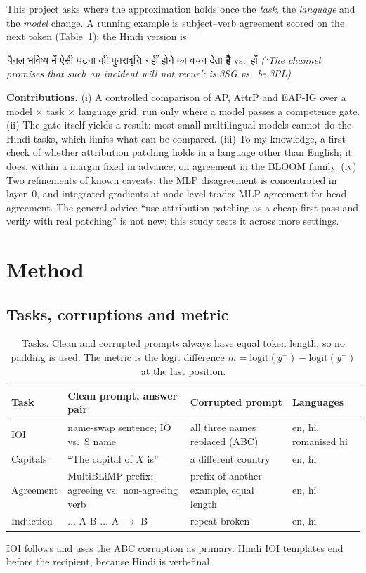\documentclass[10pt,a4paper]{article}
\newcommand{\hi}[1]{{\hindifont #1}}
\begin{document}
This project asks where the approximation holds once the \emph{task}, the \emph{language} and the \emph{model} change. A running example is subject--verb agreement scored on the next token (Table~\ref{tab:tasks}); the Hindi version is
\begin{center}\small
\hi{चैनल भविष्य में ऐसी घटना की पुनरावृत्ति नहीं होने का वचन देता} \;\textbf{\hi{है}} vs.\ \hi{हों}\quad
\textit{(`The channel promises that such an incident will not recur': is.3SG vs.\ be.3PL)}
\end{center}
\textbf{Contributions.} (i) A controlled comparison of AP, AttrP and EAP-IG over a model $\times$ task $\times$ language grid, run only where a model passes a competence gate. (ii) The gate itself yields a result: most small multilingual models cannot do the Hindi tasks, which limits what can be compared. (iii) To my knowledge, a first check of whether attribution patching holds in a language other than English; it does, within a margin fixed in advance, on agreement in the BLOOM family. (iv) Two refinements of known caveats: the MLP disagreement is concentrated in layer~0, and integrated gradients at node level trades MLP agreement for head agreement. The general advice ``use attribution patching as a cheap first pass and verify with real patching'' is not new; this study tests it across more settings.

\section{Method}
\subsection{Tasks, corruptions and metric}
\begin{table}[h]
\centering\small
\begin{tabular}{@{}lp{5.6cm}p{4.3cm}p{2.2cm}@{}}
\toprule
Task & Clean prompt, answer pair & Corrupted prompt & Languages\\
\midrule
IOI & name-swap sentence; IO vs.\ S name & all three names replaced (ABC) & en, hi, romanised hi\\
Capitals & ``The capital of $X$ is'' & a different country & en, hi\\
Agreement & MultiBLiMP prefix; agreeing vs.\ non-agreeing verb \citep{jumelet2025multiblimp} & prefix of another example, equal length & en, hi\\
Induction & $\dots$ A B $\dots$ A $\to$ B & repeat broken & en, hi\\
\bottomrule
\end{tabular}
\caption{Tasks. Clean and corrupted prompts always have equal token length, so no padding is used. The metric is the logit difference $m=\mathrm{logit}(y^+)-\mathrm{logit}(y^-)$ at the last position.}
\label{tab:tasks}
\end{table}
IOI follows \citet{wang2022ioi} and uses the ABC corruption as primary. Hindi IOI templates end before the recipient, because Hindi is verb-final.
\end{document}
